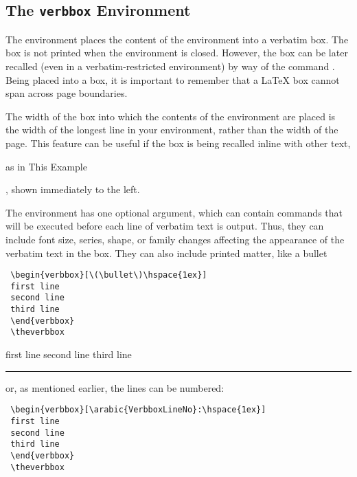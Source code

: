 \documentclass{article}
\newcommand\rl{\rule{1em}{0in}}
\newcommand\margenv[1]{\marginpar{\hfill\ttfamily#1}}
\begin{document}
\begin{myverbbox}{\myvb}
\subsection{The \texttt{verbbox} Environment}

The {\vrbox} environment places the content of the environment into a
verbatim box.  The box is not printed when the environment is closed.
However, the box can be later recalled (even in a verbatim-restricted
environment) by way of the command \tvb\margenv{\tvb}.  Being placed
into a box, it is important to remember that a \LaTeX{} box cannot span
across page boundaries.

The width of the box into which the contents of the environment are
placed is the width of the longest line in your environment, rather than
the width of the page.  This feature can be useful if the box is being
recalled inline with other text,
\begin{verbbox}[\scriptsize\scshape]
as in This Example
\end{verbbox}
\theverbbox, shown immediately to the left.

The environment has one optional argument, which can contain commands
that will be executed before each line of verbatim text is output.
Thus, they can include font size, series, shape, or family changes
affecting the appearance of the verbatim text in the box.  They can also
include printed matter, like a bullet

\begin{verbatim}
 \begin{verbbox}[\(\bullet\)\hspace{1ex}]
 first line
 second line
 third line
 \end{verbbox}
 \theverbbox
\end{verbatim}

\begin{verbbox}[\(\bullet\)\hspace{1ex}]
first line
second line
third line
\end{verbbox}
\rl\theverbbox

or, as mentioned earlier, the lines can be numbered:

\begin{verbatim}
 \begin{verbbox}[\arabic{VerbboxLineNo}:\hspace{1ex}]
 first line
 second line
 third line
 \end{verbbox}
 \theverbbox
\end{verbatim}


\end{myverbbox}
\end{document}
